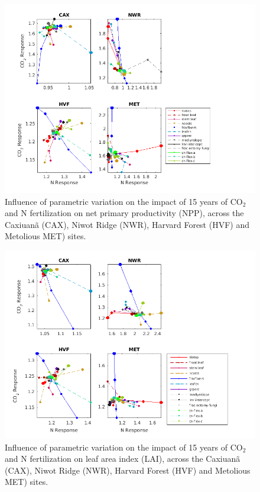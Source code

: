 \documentclass[draft,linenumbers]{agujournal}
\begin{document}
 \begin{figure}[h]
     \centering
     \includegraphics[width=1.55\textwidth, left]{matlab/figures/NOVc_CNdep_NPP1__p2012.png}
     \caption{Influence of parametric variation on the impact of 15 years of CO$_{2}$ and N fertilization on net primary productivity (NPP), across the Caxiuan\~a (CAX), Niwot Ridge (NWR), Harvard Forest (HVF) and Metolious MET) sites.}
     \label{NPP CO2 and N respones 2001}
  \end{figure}
  
  \begin{figure}[h]
     \centering
     \includegraphics[width=1.55\textwidth, left]{matlab/figures/NOVc_CNdep_TLAI1__p2012.png}
     \caption{Influence of parametric variation on the impact of 15 years of CO$_{2}$ and N fertilization on leaf area index (LAI), across the Caxiuan\~a (CAX), Niwot Ridge (NWR), Harvard Forest (HVF) and Metolious MET) sites.}
     \label{LAI CO2 and N respones 2001}
  \end{figure}
  
\end{document}
